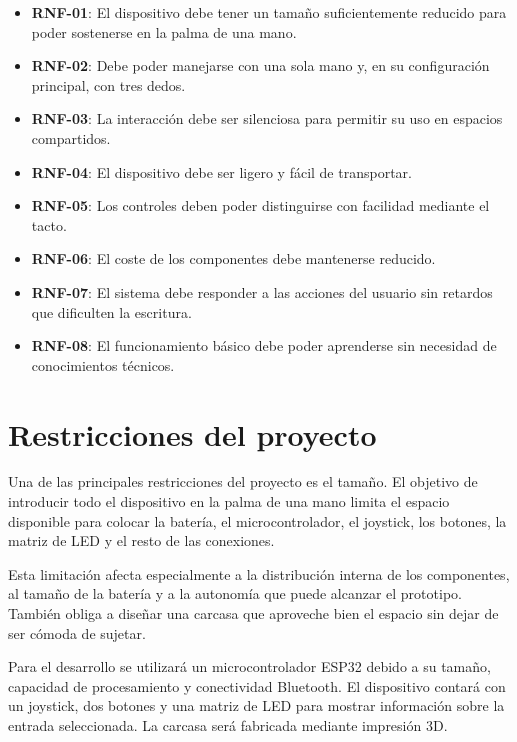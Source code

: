 \begin{itemize}
    \item \textbf{RNF-01}: El dispositivo debe tener un tamaño suficientemente reducido para poder sostenerse en la palma de una mano.

    \item \textbf{RNF-02}: Debe poder manejarse con una sola mano y, en su configuración principal, con tres dedos.

    \item \textbf{RNF-03}: La interacción debe ser silenciosa para permitir su uso en espacios compartidos.

    \item \textbf{RNF-04}: El dispositivo debe ser ligero y fácil de transportar.

    \item \textbf{RNF-05}: Los controles deben poder distinguirse con facilidad mediante el tacto.

    \item \textbf{RNF-06}: El coste de los componentes debe mantenerse reducido.

    \item \textbf{RNF-07}: El sistema debe responder a las acciones del usuario sin retardos que dificulten la escritura.

    \item \textbf{RNF-08}: El funcionamiento básico debe poder aprenderse sin necesidad de conocimientos técnicos.
\end{itemize}

\section{Restricciones del proyecto}
\label{sec:restricciones-proyecto}

Una de las principales restricciones del proyecto es el tamaño. El objetivo de introducir todo el dispositivo en la palma de una mano limita el espacio disponible para colocar la batería, el microcontrolador, el joystick, los botones, la matriz de LED y el resto de las conexiones.

Esta limitación afecta especialmente a la distribución interna de los componentes, al tamaño de la batería y a la autonomía que puede alcanzar el prototipo. También obliga a diseñar una carcasa que aproveche bien el espacio sin dejar de ser cómoda de sujetar.

Para el desarrollo se utilizará un microcontrolador ESP32 debido a su tamaño, capacidad de procesamiento y conectividad Bluetooth. El dispositivo contará con un joystick, dos botones y una matriz de LED para mostrar información sobre la entrada seleccionada. La carcasa será fabricada mediante impresión 3D.

